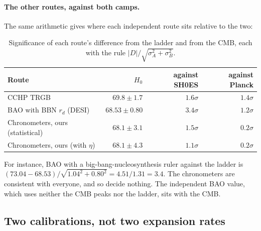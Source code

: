 \paragraph{The other routes, against both camps.} The same arithmetic gives where each independent
route sits relative to the two:

\begin{table}[htbp]
\centering
\small
\renewcommand{\arraystretch}{1.25}
\begin{tabular}{@{}lrrr@{}}
\toprule
Route & $H_0$ & against SH0ES & against Planck\\
\midrule
CCHP TRGB & $69.8\pm1.7$ & $1.6\sigma$ & $1.4\sigma$\\
BAO with BBN $r_d$ (DESI) & $68.53\pm0.80$ & $3.4\sigma$ & $1.2\sigma$\\
Chronometers, ours (statistical) & $68.1\pm3.1$ & $1.5\sigma$ & $0.2\sigma$\\
Chronometers, ours (with $\eta$) & $68.1\pm4.3$ & $1.1\sigma$ & $0.2\sigma$\\
\bottomrule
\end{tabular}
\caption{Significance of each route's difference from the ladder and from the CMB, each with the
rule $|D|/\sqrt{\sigma_A^2+\sigma_B^2}$.}
\label{11c:tab:h0-pulls}
\end{table}

For instance, BAO with a big-bang-nucleosynthesis ruler against the ladder is
$(73.04-68.53)/\sqrt{1.04^2+0.80^2}=4.51/1.31=3.4$. The chronometers are consistent with
everyone, and so decide nothing. The independent BAO value, which uses neither the CMB peaks
nor the ladder, sits with the CMB.

\subsection{Two calibrations, not two expansion rates}
\label{11c:sec:h0-calibrations}

